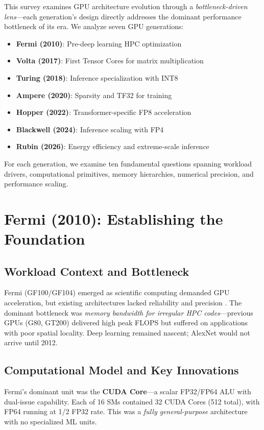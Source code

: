 \documentclass{article}
\begin{document}
This survey examines GPU architecture evolution through a \textit{bottleneck-driven lens}---each generation's design directly addresses the dominant performance bottleneck of its era. We analyze seven GPU generations:

\begin{itemize}
\item \textbf{Fermi (2010)}: Pre-deep learning HPC optimization
\item \textbf{Volta (2017)}: First Tensor Cores for matrix multiplication
\item \textbf{Turing (2018)}: Inference specialization with INT8
\item \textbf{Ampere (2020)}: Sparsity and TF32 for training
\item \textbf{Hopper (2022)}: Transformer-specific FP8 acceleration
\item \textbf{Blackwell (2024)}: Inference scaling with FP4
\item \textbf{Rubin (2026)}: Energy efficiency and extreme-scale inference
\end{itemize}

For each generation, we examine ten fundamental questions spanning workload drivers, computational primitives, memory hierarchies, numerical precision, and performance scaling.

\section{Fermi (2010): Establishing the Foundation}

\subsection{Workload Context and Bottleneck}

Fermi (GF100/GF104) emerged as scientific computing demanded GPU acceleration, but existing architectures lacked reliability and precision \cite{nvidia2009fermi}. The dominant bottleneck was \textit{memory bandwidth for irregular HPC codes}---previous GPUs (G80, GT200) delivered high peak FLOPS but suffered on applications with poor spatial locality. Deep learning remained nascent; AlexNet would not arrive until 2012.

\subsection{Computational Model and Key Innovations}

Fermi's dominant unit was the \textbf{CUDA Core}---a scalar FP32/FP64 ALU with dual-issue capability. Each of 16 SMs contained 32 CUDA Cores (512 total), with FP64 running at 1/2 FP32 rate. This was a \textit{fully general-purpose} architecture with no specialized ML units.
\end{document}
